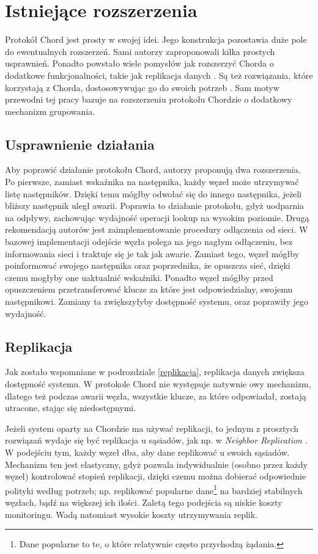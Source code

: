 \documentclass[12pt, twoside, openany]{report}
\begin{document}
\section{Istniejące rozszerzenia}

Protokół Chord jest prosty w swojej idei. Jego konstrukcja pozostawia duże pole do ewentualnych rozszerzeń. Sami autorzy zaproponowali kilka prostych usprawnień. Ponadto powstało wiele pomysłów jak rozszerzyć Chorda o dodatkowe funkcjonalności, takie jak replikacja danych \cite{bib:paiva}. Są też rozwiązania, które korzystają z Chorda, dostosowywując go do swoich potrzeb \cite{bib:tac, bib:rollerchain}. Sam motyw przewodni tej pracy bazuje na rozszerzeniu protokołu Chordzie o dodatkowy mechanizm grupowania.

\subsection{Usprawnienie działania}

Aby poprawić działanie protokołu Chord, autorzy proponują dwa rozszerzenia. Po pierwsze, zamiast wskaźnika na następnika, każdy węzeł może utrzymywać listę następników. Dzięki temu mógłby odwołać się do innego następnika, jeżeli bliższy następnik uległ awarii. Poprawia to działanie protokołu, gdyż uodparnia na odpływy, zachowując wydajność operacji lookup na wysokim poziomie. Drugą rekomendacją autorów jest zaimplementowanie procedury odłączenia od sieci. W bazowej implementacji odejście węzła polega na jego nagłym odłączeniu, bez informowania sieci i traktuje się je tak jak awarie. Zamiast tego, węzeł mógłby poinformować swojego następnika oraz poprzednika, że opuszcza sieć, dzięki czemu mogłyby one uaktualnić wskaźniki. Ponadto węzeł mógłby przed opuszczeniem przetransferować klucze za które jest odpowiedzialny, swojemu następnikowi. Zamiany ta zwiększyłyby dostępność systemu, oraz poprawiły jego wydajność.

\subsection{Replikacja}

Jak zostało wspomniane w podrozdziale \ref{replikacja}, replikacja danych zwiększa dostępność systemu. W protokole Chord nie występuje natywnie owy mechanizm, dlatego też podczas awarii węzła, wszystkie klucze, za które odpowiadał, zostają utracone, stając się niedostępnymi. 

Jeżeli system oparty na Chordzie ma używać replikacji, to jednym z prosztych rozwiązań wydaje się być replikacja u sąsiadów, jak np. w \textit{Neighbor Replication} \cite{bib:paiva}. W podejściu tym, każdy węzeł dba, aby dane replikować u swoich sąsiadów. Mechanizm ten jest elastyczny, gdyż pozwala indywidualnie (osobno przez każdy węzeł) kontrolować stopień replikacji, dzięki czemu można dobierać odpowiednie polityki według potrzeb; np. replikować popularne dane\footnote{Dane popularne to te, o które relatywnie często przychodzą żądania.} na bardziej stabilnych węzłach, bądź na większej ich ilości. Zaletą tego podejścia są niskie koszty monitoringu. Wadą natomiast wysokie koszty utrzymywania replik.
\end{document}
